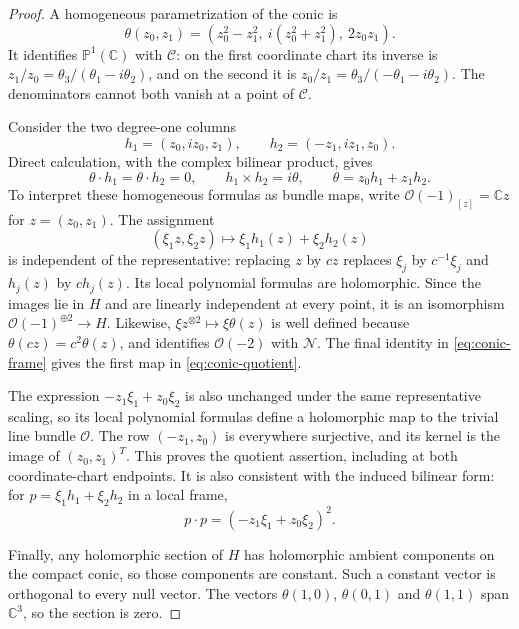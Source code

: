 \documentclass[11pt]{article}
\newcommand{\C}{\mathbb C}
\theoremstyle{remark}
\numberwithin{equation}{section}
\begin{document}
\begin{proof}
A homogeneous parametrization of the conic is
\begin{equation}\label{eq:conic-parametrization}
 \theta(z_0,z_1)
   =(z_0^2-z_1^2,\ i(z_0^2+z_1^2),\ 2z_0z_1).
\end{equation}
It identifies $\mathbb P^1(\C)$ with $\mathcal C$: on the first coordinate
chart its inverse is
$z_1/z_0=\theta_3/(\theta_1-i\theta_2)$, and on the second it is
$z_0/z_1=\theta_3/(-\theta_1-i\theta_2)$.  The denominators cannot both
vanish at a point of $\mathcal C$.

Consider the two degree-one columns
\[
 h_1=(z_0,iz_0,z_1),\qquad
 h_2=(-z_1,iz_1,z_0).
\]
Direct calculation, with the complex bilinear product, gives
\begin{equation}\label{eq:conic-frame}
 \theta\cdot h_1=\theta\cdot h_2=0,\qquad
 h_1\times h_2=i\theta,\qquad
 \theta=z_0h_1+z_1h_2.
\end{equation}
To interpret these homogeneous formulas as bundle maps, write
$\mathcal O(-1)_{[z]}=\C z$ for $z=(z_0,z_1)$.
The assignment
\[
 (\xi_1z,\xi_2z)\longmapsto \xi_1h_1(z)+\xi_2h_2(z)
\]
is independent of the representative: replacing $z$ by $cz$ replaces
$\xi_j$ by $c^{-1}\xi_j$ and $h_j(z)$ by $ch_j(z)$.
Its local polynomial formulas are holomorphic. Since the images lie in
$H$ and are linearly independent at every point, it is an isomorphism
$\mathcal O(-1)^{\oplus2}\to H$. Likewise,
$\xi z^{\otimes2}\mapsto\xi\theta(z)$ is well defined because
$\theta(cz)=c^2\theta(z)$, and identifies $\mathcal O(-2)$ with
$\mathcal N$. The final identity in \eqref{eq:conic-frame} gives the
first map in \eqref{eq:conic-quotient}.

The expression $-z_1\xi_1+z_0\xi_2$ is also unchanged under the same
representative scaling, so its local polynomial formulas define a
holomorphic map to the trivial line bundle $\mathcal O$. The row
$(-z_1,z_0)$ is everywhere surjective, and its kernel is the image of
$(z_0,z_1)^T$.
This proves the quotient assertion, including at both coordinate-chart
endpoints.  It is also consistent with the induced bilinear form: for
$p=\xi_1 h_1+\xi_2 h_2$ in a local frame,
\[
 p\cdot p=(-z_1\xi_1+z_0\xi_2)^2.
\]

Finally, any holomorphic section of $H$ has holomorphic ambient components
on the compact conic, so those components are constant.  Such a constant
vector is orthogonal to every null vector.  The vectors
$\theta(1,0)$, $\theta(0,1)$ and $\theta(1,1)$ span $\C^3$, so the
section is zero.
\end{proof}
\end{document}
